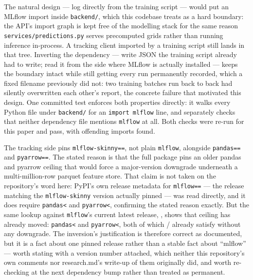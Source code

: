  The natural design --- log directly from
the training script --- would put an MLflow import inside \texttt{backend/},
which this codebase treats as a hard boundary: the API's import graph is kept
free of the modelling stack for the same reason \texttt{services/predictions.py}
serves precomputed grids rather than running inference in-process. A tracking
client imported by a training script still lands in that tree. Inverting the
dependency --- write JSON the training script already had to write; read it
from the side where MLflow is actually installed --- keeps the boundary
intact while still getting every run permanently recorded, which a fixed
filename previously did not: two training batches run back to back had
silently overwritten each other's report, the concrete failure that
motivated this design. One committed test enforces both properties directly:
it walks every Python file under \texttt{backend/} for an \texttt{import
mlflow} line, and separately checks that neither dependency file mentions
\texttt{mlflow} at all. Both checks were re-run for this paper and pass,
with \BackendMlflowOffenders{} offending imports found.

 The tracking
side pins \texttt{mlflow-skinny==\MlflowSkinnyPinned{}}, not plain
\texttt{mlflow}, alongside \texttt{pandas==\PandasPinned{}} and
\texttt{pyarrow==\PyarrowPinned{}}. The stated reason is that the full
package pins an older pandas and pyarrow ceiling that would force a
major-version downgrade underneath a multi-million-row parquet feature
store. That claim is not taken on the repository's word here: PyPI's own
release metadata for \texttt{mlflow==\MlflowMatchedVersion{}} --- the release
matching the \texttt{mlflow-skinny} version actually pinned --- was read
directly, and it does require \texttt{pandas<\MlflowMatchedPandasCeiling{}}
and \texttt{pyarrow<\MlflowMatchedPyarrowCeiling{}}, confirming the stated
reason exactly. But the same lookup against \texttt{mlflow}'s current latest
release, \MlflowLatestVersion{}, shows that ceiling has already moved:
\texttt{pandas<\MlflowLatestPandasCeiling{}} and
\texttt{pyarrow<\MlflowLatestPyarrowCeiling{}}, both of which
\PandasPinned{}/\PyarrowPinned{} already satisfy without any downgrade. The
inversion's justification is therefore correct as documented, but it is a
fact about one pinned release rather than a stable fact about ``mlflow'' ---
worth stating with a version number attached, which neither this
repository's own comments nor research.md's write-up of them originally did,
and worth re-checking at the next dependency bump rather than treated as
permanent.

